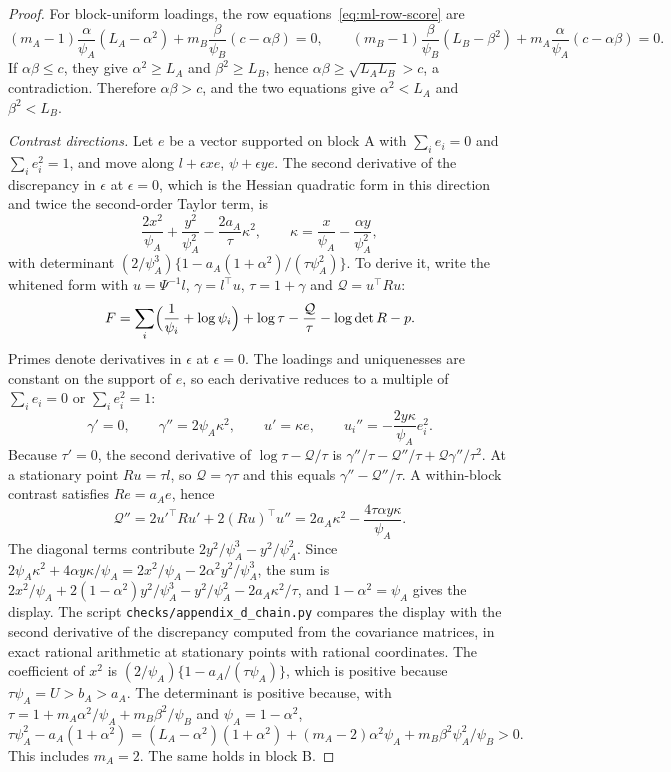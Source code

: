 \begin{proof}
For block-uniform loadings, the row equations~\eqref{eq:ml-row-score} are
\[
(m_A-1)\frac{\alpha}{\psi_A}(L_A-\alpha^2)+m_B\frac{\beta}{\psi_B}(c-\alpha\beta)=0,
\qquad
(m_B-1)\frac{\beta}{\psi_B}(L_B-\beta^2)+m_A\frac{\alpha}{\psi_A}(c-\alpha\beta)=0.
\]
If $\alpha\beta\le c$, they give $\alpha^2\ge L_A$ and $\beta^2\ge L_B$, hence $\alpha\beta\ge\sqrt{L_AL_B}>c$, a contradiction. Therefore $\alpha\beta>c$, and the two equations give $\alpha^2<L_A$ and $\beta^2<L_B$.

\textit{Contrast directions.} Let $e$ be a vector supported on block A with $\sum_ie_i=0$ and $\sum_ie_i^2=1$, and move along $l+\epsilon xe$, $\psi+\epsilon ye$. The second derivative of the discrepancy in $\epsilon$ at $\epsilon=0$, which is the Hessian quadratic form in this direction and twice the second-order Taylor term, is
\[
\frac{2x^2}{\psi_A}+\frac{y^2}{\psi_A^2}
-\frac{2a_A}{\tau}\kappa^2,\qquad \kappa=\frac x{\psi_A}-\frac{\alpha y}{\psi_A^2},
\]
with determinant $(2/\psi_A^3)\{1-a_A(1+\alpha^2)/(\tau\psi_A^2)\}$. To derive it, write the whitened form with $u=\Psi^{-1}l$, $\gamma=l^{\top}u$, $\tau=1+\gamma$ and $\mathcal Q=u^{\top}Ru$:
\[
F=\sum_i\Bigl(\frac1{\psi_i}+\log\psi_i\Bigr)+\log\tau-\frac{\mathcal Q}\tau-\log\det R-p .
\]
Primes denote derivatives in $\epsilon$ at $\epsilon=0$. The loadings and uniquenesses are constant on the support of $e$, so each derivative reduces to a multiple of $\sum_ie_i=0$ or $\sum_ie_i^2=1$:
\[
\gamma'=0,\qquad\gamma''=2\psi_A\kappa^2,\qquad u'=\kappa e,\qquad u_i''=-\frac{2y\kappa}{\psi_A}e_i^2 .
\]
Because $\tau'=0$, the second derivative of $\log\tau-\mathcal Q/\tau$ is $\gamma''/\tau-\mathcal Q''/\tau+\mathcal Q\gamma''/\tau^2$. At a stationary point $Ru=\tau l$, so $\mathcal Q=\gamma\tau$ and this equals $\gamma''-\mathcal Q''/\tau$. A within-block contrast satisfies $Re=a_Ae$, hence
\[
\mathcal Q''=2u'^{\top}Ru'+2(Ru)^{\top}u''=2a_A\kappa^2-\frac{4\tau\alpha y\kappa}{\psi_A} .
\]
The diagonal terms contribute $2y^2/\psi_A^3-y^2/\psi_A^2$. Since $2\psi_A\kappa^2+4\alpha y\kappa/\psi_A=2x^2/\psi_A-2\alpha^2y^2/\psi_A^3$, the sum is $2x^2/\psi_A+2(1-\alpha^2)y^2/\psi_A^3-y^2/\psi_A^2-2a_A\kappa^2/\tau$, and $1-\alpha^2=\psi_A$ gives the display. The script \texttt{checks/appendix\_d\_chain.py} compares the display with the second derivative of the discrepancy computed from the covariance matrices, in exact rational arithmetic at stationary points with rational coordinates. The coefficient of $x^2$ is $(2/\psi_A)\{1-a_A/(\tau\psi_A)\}$, which is positive because $\tau\psi_A=U>b_A>a_A$. The determinant is positive because, with $\tau=1+m_A\alpha^2/\psi_A+m_B\beta^2/\psi_B$ and $\psi_A=1-\alpha^2$,
\[
\tau\psi_A^2-a_A(1+\alpha^2)
=(L_A-\alpha^2)(1+\alpha^2)+(m_A-2)\alpha^2\psi_A+m_B\beta^2\psi_A^2/\psi_B>0 .
\]
This includes $m_A=2$. The same holds in block B.


\end{proof}
